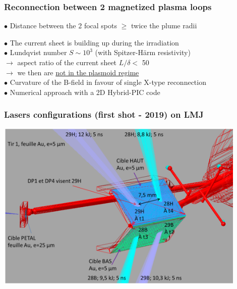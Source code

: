 \documentclass{beamer}
\begin{document}
\begin{frame}
\frametitle{Reconnection between 2 magnetized plasma loops}

$\bullet$ Distance between the 2 focal spots $\geq$ twice the plume radii

\begin{center}

\end{center}

$\bullet$ The current sheet is building up during the irradiation \\
$\bullet$ Lundqvist number $S \sim 10^3$ (with Spitzer-H\"arm resistivity) \\
$\to$ aspect ratio of the current sheet $L/\delta < $ 50 \\
$\to$ we then are \underline{not in the plasmoid regime} \\
$\bullet$ Curvature of the B-field in favour of single X-type reconnection \\
$\bullet$ Numerical approach with a 2D Hybrid-PIC code \\

\end{frame}



\begin{frame}
\frametitle{Lasers configurations (first shot - 2019) on LMJ}

\begin{center}
\includegraphics[width=0.9\textwidth]{tir1.png}
\end{center}

\end{frame}
\end{document}
